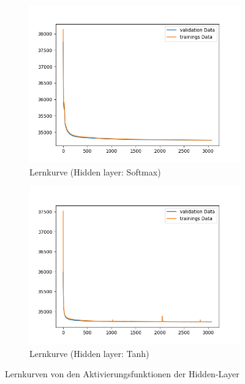 \begin{figure}[ht]
\centering
\begin{subfigure}{0.5\textwidth}
\centering
\includegraphics[width=\linewidth]{pics/lernkurve_activationHidden-softmax_activationOutput-softmax}
\caption{Lernkurve (Hidden layer: Softmax)}
\label{fig:lernkurveSoftmax}
\end{subfigure}%
\begin{subfigure}{0.5\textwidth}
\centering
\includegraphics[width=\linewidth]{pics/lernkurve_activationHidden-tanh_activationOutput-softmax}
\caption{Lernkurve (Hidden layer: Tanh)}
\label{fig:lernkurveTanh}
\end{subfigure}%
\caption{Lernkurven von den Aktivierungsfunktionen der Hidden-Layer}
\label{fig:lernkurven}
\end{figure}



